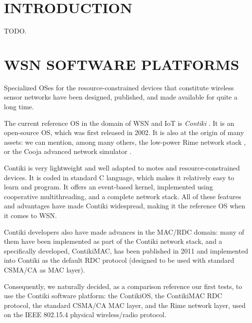 \documentclass[a4paper,twoside]{article}
\begin{document}
\onecolumn \maketitle \normalsize \vfill


\section{\uppercase{Introduction}}

TODO.



\section{\uppercase{WSN Software platforms}}

Specialized OSes for the resource-constrained devices that constitute
wireless sensor networks have been designed, published, and made available
for quite a long time.


The current reference OS in the domain of WSN and IoT is \emph{Contiki}
\cite{ContikiOS}. It is an open-source OS, which was first released
in 2002. It is also at the origin of many assets: we can mention, among
many others, the low-power Rime network stack \cite{Rime}, or the Cooja
advanced network simulator \cite{Cooja}.

Contiki is very lightweight and well adapted to motes and
resource-constrained devices. It is coded in standard C language, which
makes it relatively easy to learn and program. It offers an event-based
kernel, implemented using cooperative multithreading, and a complete
network stack. All of these features and advantages have made
Contiki widespread, making it the reference OS when it comes to WSN.

Contiki developers also have made advances in the MAC/RDC domain: many
of them have been implemented as part of the Contiki network stack, and
a specifically developed, ContikiMAC, has been published in 2011
\cite{ContikiMAC} and implemented into Contiki as the default
RDC protocol (designed to be used with standard CSMA/CA as MAC layer).

Consequently, we naturally decided, as a comparison reference our first tests,
to use the Contiki software platform: the ContikiOS, the ContikiMAC RDC
protocol, the standard CSMA/CA MAC layer, and the Rime network layer, used
on the IEEE 802.15.4 physical wireless/radio protocol.
\end{document}
